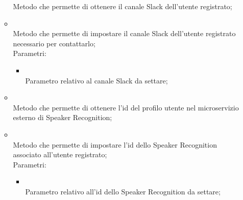 \begin{itemize}
\begin{itemize}
		Metodo che permette di ottenere il canale Slack dell'utente registrato;\\
		\item[]  \\
		Metodo che permette di impostare il canale Slack dell'utente registrato necessario per contattarlo;\\
		Parametri:
		\begin{itemize}
			\item {} \\
			Parametro relativo al canale Slack da settare;
		\end{itemize}
		\item[]  \\
		Metodo che permette di ottenere l'id del profilo utente nel microservizio esterno di Speaker Recognition;\\
		\item[]  \\
		Metodo che permette di impostare l'id dello Speaker Recognition associato all'utente registrato;\\
		Parametri:
		\begin{itemize}
			\item {} \\
			Parametro relativo all'id dello Speaker Recognition da settare;
		\end{itemize}
	\end{itemize}
\end{itemize}
\FloatBarrier

